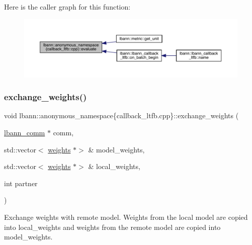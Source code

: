 Here is the caller graph for this function\+:\nopagebreak
\begin{figure}[H]
\begin{center}
\leavevmode
\includegraphics[width=350pt]{namespacelbann_1_1anonymous__namespace_02callback__ltfb_8cpp_03_a2525bf058156612d7847d0754277e4fc_icgraph}
\end{center}
\end{figure}
\mbox{\label{namespacelbann_1_1anonymous__namespace_02callback__ltfb_8cpp_03_a2b155d39e6dba02a34a7c58d804d865e}} 
\subsubsection{\texorpdfstring{exchange\+\_\+weights()}{exchange\_weights()}}
{\footnotesize\ttfamily void lbann\+::anonymous\+\_\+namespace\{callback\+\_\+ltfb.\+cpp\}\+::exchange\+\_\+weights (\begin{DoxyParamCaption}\item[{\hyperlink{classlbann_1_1lbann__comm}{lbann\+\_\+comm} $\ast$}]{comm,  }\item[{std\+::vector$<$ \hyperlink{classlbann_1_1weights}{weights} $\ast$$>$ \&}]{model\+\_\+weights,  }\item[{std\+::vector$<$ \hyperlink{classlbann_1_1weights}{weights} $\ast$$>$ \&}]{local\+\_\+weights,  }\item[{int}]{partner }\end{DoxyParamCaption})}

Exchange weights with remote model. Weights from the local model are copied into local\+\_\+weights and weights from the remote model are copied into model\+\_\+weights. 

